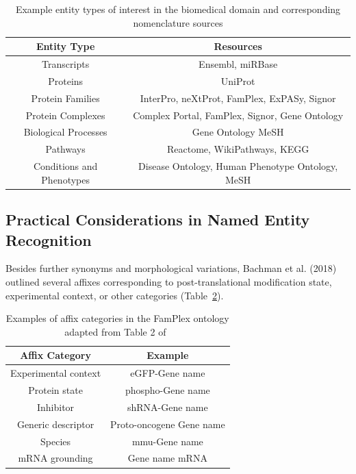\begin{table}
    \centering
    \begin{tabular}{ c c }
        Entity Type & Resources \\
        \hline
        Transcripts & Ensembl, miRBase \\
        Proteins & UniProt \\
        Protein Families & InterPro, neXtProt, FamPlex, ExPASy, Signor \\
        Protein Complexes & Complex Portal, FamPlex, Signor, Gene Ontology \\
        Biological Processes & Gene Ontology MeSH \\
        Pathways & Reactome, WikiPathways, KEGG \\
        Conditions and Phenotypes & Disease Ontology, Human Phenotype Ontology, MeSH
    \end{tabular}
    \caption{Example entity types of interest in the biomedical domain and corresponding nomenclature sources}
    \label{table:other_nomenclature_databases}
\end{table}

\subsection{Practical Considerations in Named Entity Recognition}

Besides further synonyms and morphological variations, Bachman et al. (2018)~\cite{Bachman2018} outlined several affixes corresponding to post-translational modification state, experimental context, or other categories (Table~\ref{table:affix_categories}).

\begin{table}
    \centering
    \begin{tabular}{ c c }
        Affix Category & Example \\
        \hline
        Experimental context & eGFP-{Gene name} \\
        Protein state & phospho-{Gene name} \\
        Inhibitor & shRNA-{Gene name} \\
        Generic descriptor & Proto-oncogene {Gene name} \\
        Species & mmu-{Gene name} \\
        mRNA grounding & {Gene name} mRNA
    \end{tabular}
    \caption{Examples of affix categories in the FamPlex ontology adapted from Table 2 of~\cite{Bachman2018}}
    \label{table:affix_categories}
\end{table}

